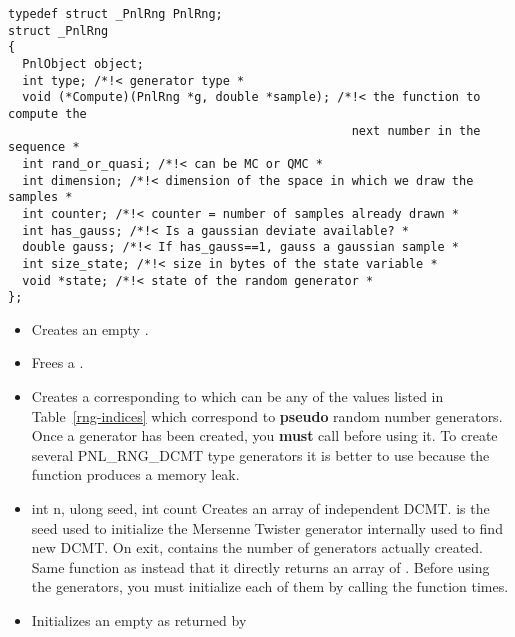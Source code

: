 \begin{verbatim}
typedef struct _PnlRng PnlRng;
struct _PnlRng
{
  PnlObject object;
  int type; /*!< generator type *
  void (*Compute)(PnlRng *g, double *sample); /*!< the function to compute the
                                                next number in the sequence *
  int rand_or_quasi; /*!< can be MC or QMC *
  int dimension; /*!< dimension of the space in which we draw the samples *
  int counter; /*!< counter = number of samples already drawn *
  int has_gauss; /*!< Is a gaussian deviate available? *
  double gauss; /*!< If has_gauss==1, gauss a gaussian sample *
  int size_state; /*!< size in bytes of the state variable *
  void *state; /*!< state of the random generator *
};
\end{verbatim}


\begin{itemize}
\item {}
  \sshortdescribe Creates an empty \ptr.
\item {}
  \sshortdescribe Frees a .
\item {}
  \sshortdescribe Creates a  corresponding to 
  which can be any of the values  listed in
  Table~\ref{rng-indices} which correspond to {\bf pseudo} random number generators.
  Once a generator has been created, you {\bf must} call
   before using it. To create several PNL_RNG_DCMT type
  generators it is better to use  because the
  function  produces a memory leak.
\item {}
  {int n, ulong seed, int \ptr count}
  \sshortdescribe Creates an array of  independent DCMT.  is
  the seed used to initialize the Mersenne Twister generator internally used to
  find new DCMT. On exit,  contains the number of generators actually
  created. Same function as  instead that it
  directly returns an array of . Before using the generators, you
  must initialize each of them by calling the function 
   times.
\item {}
  \sshortdescribe Initializes an empty  as returned by

\end{itemize}
